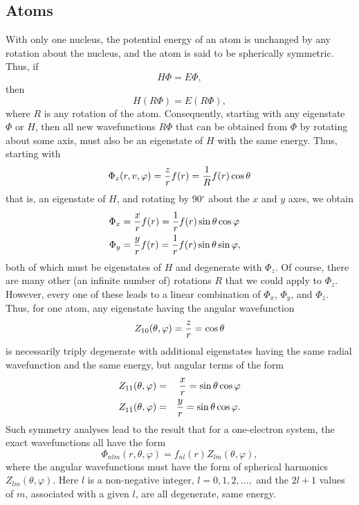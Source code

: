\subsection{Atoms}

With only one nucleus, the potential energy of an atom is 
unchanged by any rotation about the nucleus, and the atom is 
said to be spherically symmetric. Thus, if 
\begin{equation}
H \Phi = E \Phi, 
\end{equation}
then 
\begin{equation}
H(R \Phi) = E(R \Phi),
\end{equation}
 where $R$ is any rotation of the atom. Consequently, starting with
any eigenstate $\Phi$ or $H$, then all new wavefunctions $R \Phi$ that
can be obtained from $\Phi$ by rotating about some axis, must also be
an eigenstate of $H$ with the same energy.  Thus, starting with
\begin{equation}
\Phi_z ( r , v , \varphi ) = {z \over r} f(r) = {1 \over R} f (r) 
\cos \theta
\label{chap10-eqno1}
\end{equation}
that is, an eigenstate of $H$, and rotating by 90$^{\circ}$ about 
the $x$ and $y$ axes, we obtain
\begin{eqnarray}
\Phi_x &= {x \over r} f(r) = {1 \over r} f(r) \sin\theta\cos\varphi\cr
\Phi_y &= {y \over r} f(r) = {1 \over r} f(r) \sin\theta\sin\varphi,
\label{chap10-eqno2}
\end{eqnarray}
both of which must be eigenstates of $H$ and degenerate with $\Phi_z$.  Of 
course, there are many other (an infinite number of) rotations $R$ 
that we could apply to $\Phi_z$.  However, every one of these leads to 
a linear combination of $\Phi_x$, $\Phi_y$, and $\Phi_z$.  Thus, for one 
atom, any eigenstate having the angular wavefunction
\begin{equation}
Z_{10} (\theta , \varphi ) = {z \over r} = \cos\theta
\end{equation}
is necessarily triply degenerate with additional eigenstates having the
same radial wavefunction and the same energy, but angular terms of the form
\begin{eqnarray}
Z_{11}(\theta , \varphi ) &=& {x \over r} = \sin\theta\cos \varphi\cr
Z_{1{\bar{1}}}(\theta , \varphi ) &=& {y \over r} = \sin\theta\cos 
\varphi.
\end{eqnarray}
Such symmetry analyses lead to the result that for a one-electron 
system, the exact wavefunctions all have the form
\begin{equation}
\Phi_{nlm} ( r ,\theta , \varphi ) = f_{nl} (r) Z_{lm} (\theta , \varphi ) ,
\end{equation}
where the angular wavefunctions must have the form of spherical
harmonics $Z_{lm}(\theta,\varphi)$. Here $l$ is a non-negative
integer, $l = 0 , 1 , 2 , \dots ,$ and the $2l + 1$ values of $m$,
associated with a given $l$, are all degenerate, same energy.

